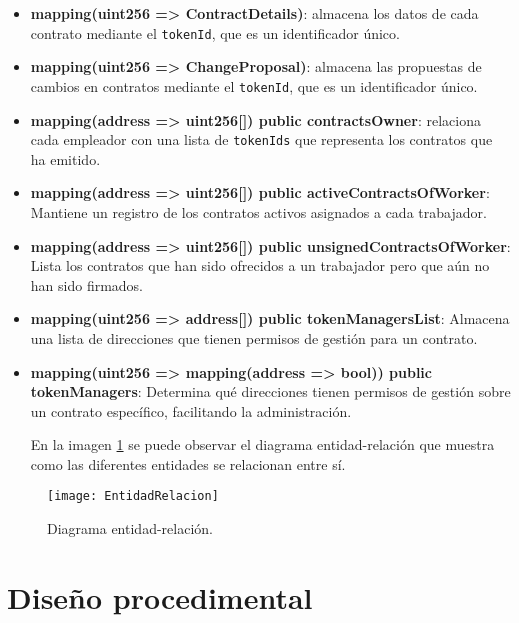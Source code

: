 \begin{itemize}

\item \textbf{mapping(uint256 => ContractDetails)}: almacena los datos de cada contrato mediante el \texttt{tokenId}, que es un identificador único.

\item \textbf{mapping(uint256 => ChangeProposal)}: almacena las propuestas de cambios en contratos mediante el \texttt{tokenId}, que es un identificador único.

\item \textbf{mapping(address => uint256[]) public contractsOwner}: relaciona cada empleador con una lista de \texttt{tokenIds} que representa los contratos que ha emitido.

\item \textbf{mapping(address => uint256[]) public activeContractsOfWorker}: Mantiene un registro de los contratos activos asignados a cada trabajador.

\item \textbf{mapping(address => uint256[]) public unsignedContractsOfWorker}: Lista los contratos que han sido ofrecidos a un trabajador pero que aún no han sido firmados.

\item \textbf{mapping(uint256 => address[]) public tokenManagersList}: Almacena una lista de direcciones que tienen permisos de gestión para un contrato.

\item \textbf{mapping(uint256 => mapping(address => bool)) public tokenManagers}: Determina qué direcciones tienen permisos de gestión sobre un contrato específico, facilitando la administración.

En la imagen \ref{img:EntidadRelacion} se puede observar el diagrama entidad-relación que muestra como las diferentes entidades se relacionan entre sí. 

\end{itemize}

\begin{figure}[h]
	\label{img:EntidadRelacion}
	\centering
	\texttt{[image: EntidadRelacion]}
	\caption[Diagrama entidad-relación]{Diagrama entidad-relación.}
\end{figure}


\section{Diseño procedimental}


